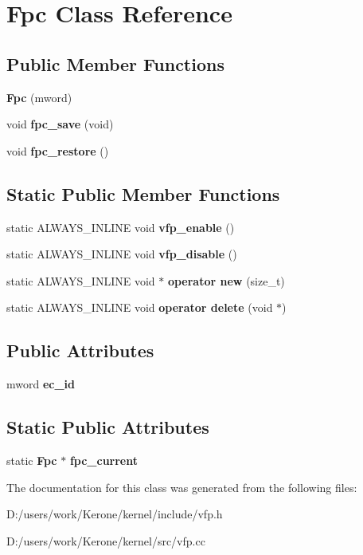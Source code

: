 \section{Fpc Class Reference}
\label{class_fpc}
\subsection*{Public Member Functions}
\begin{DoxyCompactItemize}
\item 
\mbox{\label{class_fpc_a6c4602a135cd7d257b810420c2fcb45a}} 
{\bfseries Fpc} (mword)
\item 
\mbox{\label{class_fpc_a000d4a0b2f8ec77dec1acf84be50c43e}} 
void {\bfseries fpc\+\_\+save} (void)
\item 
\mbox{\label{class_fpc_a7f19d62072bc7621ff3a96737b86e05b}} 
void {\bfseries fpc\+\_\+restore} ()
\end{DoxyCompactItemize}
\subsection*{Static Public Member Functions}
\begin{DoxyCompactItemize}
\item 
\mbox{\label{class_fpc_a641e2576226ab0e570e5b47ff8a8c8e8}} 
static A\+L\+W\+A\+Y\+S\+\_\+\+I\+N\+L\+I\+NE void {\bfseries vfp\+\_\+enable} ()
\item 
\mbox{\label{class_fpc_a3d239673264a29c835a774c1904c87cc}} 
static A\+L\+W\+A\+Y\+S\+\_\+\+I\+N\+L\+I\+NE void {\bfseries vfp\+\_\+disable} ()
\item 
\mbox{\label{class_fpc_ac345752bb6e8ca7b1a7a3d4d436ff346}} 
static A\+L\+W\+A\+Y\+S\+\_\+\+I\+N\+L\+I\+NE void $\ast$ {\bfseries operator new} (size\+\_\+t)
\item 
\mbox{\label{class_fpc_af3f75ddfb8585919c7d96510a5c02306}} 
static A\+L\+W\+A\+Y\+S\+\_\+\+I\+N\+L\+I\+NE void {\bfseries operator delete} (void $\ast$)
\end{DoxyCompactItemize}
\subsection*{Public Attributes}
\begin{DoxyCompactItemize}
\item 
\mbox{\label{class_fpc_a210ea7dbe3a91a41069dad48f7cb5e02}} 
mword {\bfseries ec\+\_\+id}
\end{DoxyCompactItemize}
\subsection*{Static Public Attributes}
\begin{DoxyCompactItemize}
\item 
\mbox{\label{class_fpc_a6f8dfbb36061b011203470913036ec22}} 
static \textbf{ Fpc} $\ast$ {\bfseries fpc\+\_\+current}
\end{DoxyCompactItemize}


The documentation for this class was generated from the following files\+:\begin{DoxyCompactItemize}
\item 
D\+:/users/work/\+Kerone/kernel/include/vfp.\+h\item 
D\+:/users/work/\+Kerone/kernel/src/vfp.\+cc\end{DoxyCompactItemize}
